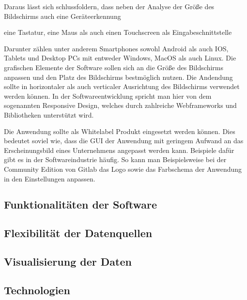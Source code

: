 Daraus lässt sich schlussfoldern, dass neben der Analyse der Größe
des Bildschirms auch eine Geräteerkennung  

eine Tastatur, eine Maus als auch einen Touchscreen als Eingabeschnittstelle 


Darunter zählen unter anderem Smartphones sowohl Android als auch IOS,
Tablets und Desktop PCs mit entweder Windows, MacOS als auch Linux. Die grafischen Elemente
der Software sollen sich an die Größe des Bildschirms anpassen und den Platz des Bildschirms
bestmöglich nutzen. Die Andendung sollte in horizontaler als auch verticaler Ausrichtung des
Bildschirms verwendet werden können. In der Softwareentwicklung spricht man hier von dem
sogenannten Responsive Design, welches durch zahlreiche Webframeworks und Bibliotheken
unterstützt wird.

Die Anwendung sollte als Whitelabel Produkt eingesetzt werden können. Dies bedeutet soviel wie,
dass die GUI der Anwendung mit geringem Aufwand an das Erscheinungsbild eines Unternehmens angepasst
werden kann. Beispiele dafür gibt es in der Softwareindustrie häufig. So kann man Beispielsweise bei
der Community Edition von Gitlab das Logo sowie das Farbschema der Anwendung in den Einstellungen
anpassen. \cite{GitlabDocs} %

\subsection{Funktionalitäten der Software}

\subsection{Flexibilität der Datenquellen}

\subsection{Visualisierung der Daten}

\subsection{Technologien}

